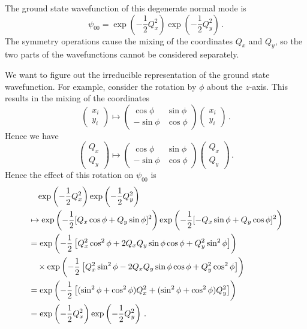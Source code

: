 \documentclass{article}
\theoremstyle{plain}\theoremheaderfont{\normalfont\itshape}\theorembodyfont{\rmfamily}\theoremseparator{.}\newtheorem*{rem}{Remark}\newtheorem*{ex}{Example}\newtheorem*{proof}{Proof}\newtheorem*{altp}{Alternative proof}
\theoremstyle{plain}\theoremheaderfont{\normalfont\bfseries}\theorembodyfont{\rmfamily}\theoremseparator{.}\newtheorem{thm}{Theorem}[section]\newtheorem{lem}[thm]{Lemma}\newtheorem{prop}[thm]{Proposition}\newtheorem*{cor}{Corollary}\newtheorem{defn}[thm]{Definition}\newtheorem{clm}[thm]{Claim}\newtheorem{clminproof}{Claim}\newtheorem{pos}{Postulate}[section]
\theoremstyle{break}\theoremheaderfont{\normalfont\itshape}\theorembodyfont{\rmfamily}\theoremseparator{.\medskip}\newtheorem*{proofskip}{Proof}\newtheorem*{exs}{Examples}\newtheorem*{rems}{Remarks}
\theoremstyle{break}\theoremheaderfont{\normalfont\bfseries}\theorembodyfont{\rmfamily}\theoremseparator{.\medskip}\newtheorem{lemskip}[thm]{Lemma}\newtheorem{defnskip}[thm]{Definition}\newtheorem{propskip}[thm]{Proposition}\newtheorem{thmskip}[thm]{Theorem}
\numberwithin{equation}{section}
\begin{document}
    The ground state wavefunction of this degenerate normal mode is
    \begin{equation}
        \psi_{00}=\exp\left(-\frac{1}{2}Q_x^2\right)\exp\left(-\frac{1}{2}Q_y^2\right)\,.
    \end{equation}
    The symmetry operations cause the mixing of the coordinates \(Q_x\) and \(Q_y\), so the two parts of the wavefunctions cannot be considered separately.

    We want to figure out the irreducible representation of the ground state wavefunction. For example, consider the rotation by \(\phi\) about the \(z\)-axis. This results in the mixing of the coordinates
    \begin{equation}
        \begin{pmatrix}
            x_i \\ y_i
        \end{pmatrix}\longmapsto\begin{pmatrix}
            \cos\phi & \sin\phi \\
            -\sin\phi & \cos\phi
        \end{pmatrix}\begin{pmatrix}
            x_i \\ y_i
        \end{pmatrix}\,.
    \end{equation}
    Hence we have
    \begin{equation}
        \begin{pmatrix}
            Q_x \\ Q_y
        \end{pmatrix}\longmapsto\begin{pmatrix}
            \cos\phi & \sin\phi \\
            -\sin\phi & \cos\phi
        \end{pmatrix}\begin{pmatrix}
            Q_x \\ Q_y
        \end{pmatrix}\,.
    \end{equation}
    Hence the effect of this rotation on \(\psi_{00}\) is
    \begin{align}
        &\quad \exp\left(-\frac{1}{2}Q_x^2\right)\exp\left(-\frac{1}{2}Q_y^2\right)\notag\\
        &\mapsto \exp\left(-\frac{1}{2}[Q_x \cos\phi+Q_y \sin\phi]^2\right)\exp\left(-\frac{1}{2}[-Q_x\sin\phi+ Q_y \cos\phi]^2\right)\notag\\
        &=\exp\left(-\frac{1}{2}\left[Q_x^2\cos^2\phi+2Q_xQ_y\sin\phi\cos\phi+ Q_y^2 \sin^2\phi\right]\right)\notag\\
        &\quad\times \exp\left(-\frac{1}{2}\left[Q_x^2\sin^2\phi-2Q_xQ_y\sin\phi\cos\phi+Q_y^2\cos^2\phi\right]\right)\notag\\
        &=\exp\left(-\frac{1}{2}\left[(\sin^2\phi+\cos^2\phi)Q_x^2+(\sin^2\phi+\cos^2\phi)Q_y^2\right]\right)\notag\\
        &=\exp\left(-\frac{1}{2}Q_x^2\right)\exp\left(-\frac{1}{2}Q_y^2\right)\,.
    \end{align}
\end{document}
